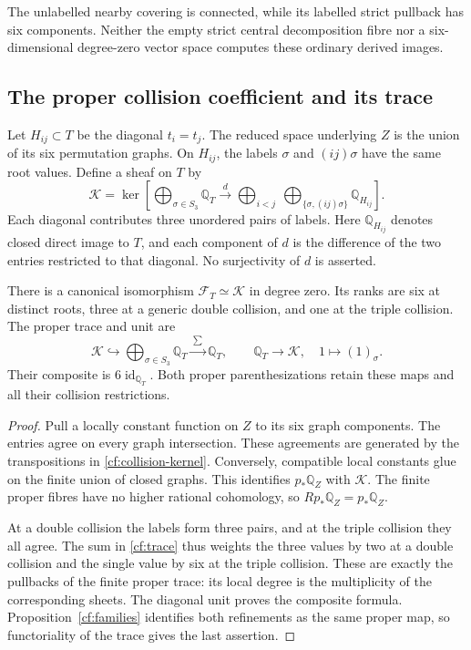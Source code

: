 The unlabelled nearby covering is connected, while its labelled
strict pullback has six components. Neither the empty strict central
decomposition fibre nor a six-dimensional degree-zero vector space
computes these ordinary derived images.

\subsection{The proper collision coefficient and its trace}

Let $H_{ij}\subset T$ be the diagonal $t_i=t_j$.
The reduced space underlying $Z$ is the union of its six permutation
graphs. On $H_{ij}$, the labels $\sigma$ and $(ij)\sigma$ have the
same root values. Define a sheaf on $T$ by
\begin{equation}\label{cf:collision-kernel}
 \mathcal K=\ker\left[
 \bigoplus_{\sigma\in S_3}\mathbb Q_T
 \xrightarrow{\ d\ }
 \bigoplus_{i<j}\ \bigoplus_{\{\sigma,(ij)\sigma\}}
                         \mathbb Q_{H_{ij}}\right].
\end{equation}
Each diagonal contributes three unordered pairs of labels.
Here $\mathbb Q_{H_{ij}}$ denotes closed direct image to $T$,
and each component of $d$ is the difference of the two entries
restricted to that diagonal. No surjectivity of $d$ is asserted.

\begin{proposition}\label{cf:proper-coefficient}
There is a canonical isomorphism $\mathcal F_T\simeq\mathcal K$
in degree zero. Its ranks are six at distinct roots, three at a
generic double collision, and one at the triple collision.
The proper trace and unit are
\begin{equation}\label{cf:trace}
 \mathcal K\hookrightarrow\bigoplus_{\sigma\in S_3}\mathbb Q_T
       \xrightarrow{\ \sum\ }\mathbb Q_T,
 \qquad
 \mathbb Q_T\longrightarrow\mathcal K,\quad
       1\longmapsto(1)_\sigma.
\end{equation}
Their composite is $6\operatorname{id}_{\mathbb Q_T}$.
Both proper parenthesizations retain these maps and all their
collision restrictions.
\end{proposition}
\begin{proof}
Pull a locally constant function on $Z$ to its six graph components.
The entries agree on every graph intersection. These agreements
are generated by the transpositions in \eqref{cf:collision-kernel}.
Conversely, compatible local constants glue on the finite union
of closed graphs. This identifies $p_*\mathbb Q_Z$ with
$\mathcal K$. The finite proper fibres have no higher rational
cohomology, so $Rp_*\mathbb Q_Z=p_*\mathbb Q_Z$.

At a double collision the labels form three pairs, and at the triple
collision they all agree. The sum in \eqref{cf:trace} thus weights
the three values by two at a double collision and the single value
by six at the triple collision. These are exactly the pullbacks of
the finite proper trace: its local degree is the multiplicity of
the corresponding sheets. The diagonal unit proves the composite
formula. Proposition~\ref{cf:families} identifies both refinements
as the same proper map, so functoriality of the trace gives the
last assertion.
\end{proof}

